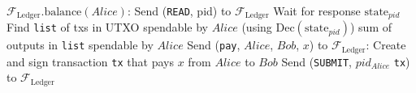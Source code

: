 \hrulefill
\ \\ 
  \label{alg:temp:formalfledger}
  \begin{algorithmic}[1]
    \State $\mathcal{F}_{\mathrm{Ledger}}\mathrm{.balance}\left(Alice\right)$:
    \State
    \State Send (\texttt{READ}, pid) to $\mathcal{F}_{\mathrm{Ledger}}$
    \State Wait for response $\mathrm{state}_{pid}$
    \State Find \texttt{list} of txs in UTXO spendable by $Alice$ (using
    $\mathrm{Dec}\left(\mathrm{state}_{pid}\right)$) 
    \State \Return sum of outputs in \texttt{list} spendable by $Alice$
    \State
    \State
    \State Send (\texttt{pay}, $Alice$, $Bob$, $x$) to
    $\mathcal{F}_{\mathrm{Ledger}}$:
    \State
    \State Create and sign transaction \texttt{tx} that pays $x$ from $Alice$ to
    $Bob$ 
    \State Send (\texttt{SUBMIT}, $pid_{Alice}$ \texttt{tx}) to
    $\mathcal{F}_{\mathrm{Ledger}}$
  \end{algorithmic}
\hrulefill
